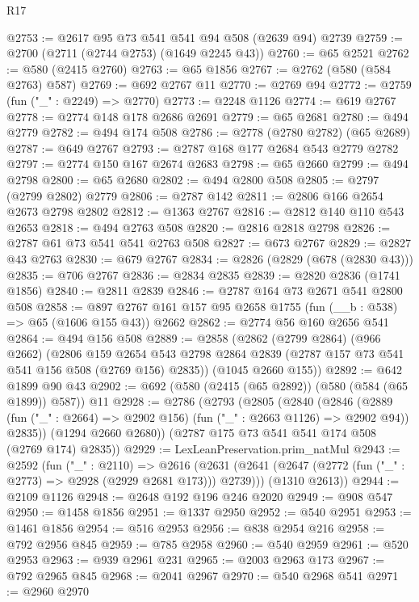 \begin{lexlean}{R17}
\begin{coremodule}
@2753 := @2617 @95 @73 @541 @541 @94 @508 (@2639 @94) @2739
@2759 := @2700 (@2711 (@2744 @2753) (@1649 @2245 @43))
@2760 := @65 @2521
@2762 := @580 (@2415 @2760)
@2763 := @65 @1856
@2767 := @2762 (@580 (@584 @2763) @587)
@2769 := @692 @2767 @11
@2770 := @2769 @94
@2772 := @2759 (fun ("_" : @2249) => @2770)
@2773 := @2248 @1126
@2774 := @619 @2767
@2778 := @2774 @148 @178 @2686 @2691
@2779 := @65 @2681
@2780 := @494 @2779
@2782 := @494 @174 @508
@2786 := @2778 (@2780 @2782) (@65 @2689)
@2787 := @649 @2767
@2793 := @2787 @168 @177 @2684 @543 @2779 @2782
@2797 := @2774 @150 @167 @2674 @2683
@2798 := @65 @2660
@2799 := @494 @2798
@2800 := @65 @2680
@2802 := @494 @2800 @508
@2805 := @2797 (@2799 @2802) @2779
@2806 := @2787 @142
@2811 := @2806 @166 @2654 @2673 @2798 @2802
@2812 := @1363 @2767
@2816 := @2812 @140 @110 @543 @2653
@2818 := @494 @2763 @508
@2820 := @2816 @2818 @2798
@2826 := @2787 @61 @73 @541 @541 @2763 @508
@2827 := @673 @2767
@2829 := @2827 @43 @2763
@2830 := @679 @2767
@2834 := @2826 (@2829 (@678 (@2830 @43)))
@2835 := @706 @2767
@2836 := @2834 @2835
@2839 := @2820 @2836 (@1741 @1856)
@2840 := @2811 @2839
@2846 := @2787 @164 @73 @2671 @541 @2800 @508
@2858 := @897 @2767 @161 @157 @95 @2658 @1755 (fun (__b : @538) => @65 (@1606 @155 @43)) @2662
@2862 := @2774 @56 @160 @2656 @541
@2864 := @494 @156 @508
@2889 := @2858
    (@2862
      (@2799 @2864)
      (@966 @2662)
      (@2806
        @159
        @2654
        @543
        @2798
        @2864
        @2839
        (@2787 @157 @73 @541 @541 @156 @508 (@2769 @156) @2835))
      (@1045 @2660 @155))
@2892 := @642 @1899 @90 @43
@2902 := @692 (@580 (@2415 (@65 @2892)) (@580 (@584 (@65 @1899)) @587)) @11
@2928 := @2786
    (@2793
      (@2805
        (@2840
          (@2846
            (@2889 (fun ("_" : @2664) => @2902 @156) (fun ("_" : @2663 @1126) => @2902 @94))
            @2835))
        (@1294 @2660 @2680))
      (@2787 @175 @73 @541 @541 @174 @508 (@2769 @174) @2835))
@2929 := LexLeanPreservation.prim_natMul
@2943 := @2592
    (fun ("_" : @2110) =>
    @2616
      (@2631 (@2641 (@2647 (@2772 (fun ("_" : @2773) => @2928 (@2929 @2681 @173))) @2739)))
      (@1310 @2613))
@2944 := @2109 @1126
@2948 := @2648 @192 @196 @246 @2020
@2949 := @908 @547
@2950 := @1458 @1856
@2951 := @1337 @2950
@2952 := @540 @2951
@2953 := @1461 @1856
@2954 := @516 @2953
@2956 := @838 @2954 @216
@2958 := @792 @2956 @845
@2959 := @785 @2958
@2960 := @540 @2959
@2961 := @520 @2953
@2963 := @939 @2961 @231
@2965 := @2003 @2963 @173
@2967 := @792 @2965 @845
@2968 := @2041 @2967
@2970 := @540 @2968 @541
@2971 := @2960 @2970

\end{coremodule}
\end{lexlean}

